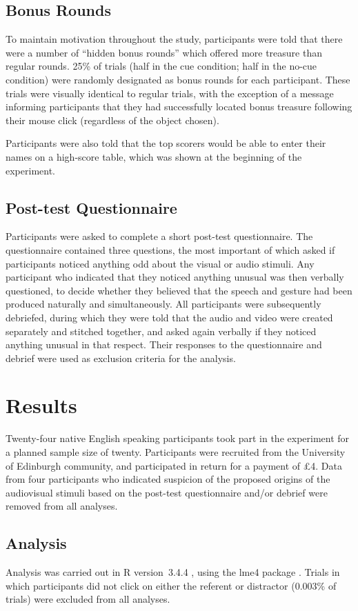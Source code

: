 \documentclass[a4paper,man,natbib]{apa6}
\begin{document}
\subsection{Bonus Rounds}
To maintain motivation throughout the study, participants were told that there were a number of ``hidden bonus rounds'' which offered more treasure than regular rounds.
25\% of trials (half in the cue condition; half in the no-cue condition) were randomly designated as bonus rounds for each participant.
These trials were visually identical to regular trials, with the exception of a message informing participants that they had successfully located bonus treasure following their mouse click (regardless of the object chosen).

Participants were also told that the top scorers would be able to enter their names on a high-score table, which was shown at the beginning of the experiment. 

\subsection{Post-test Questionnaire}
Participants were asked to complete a short post-test questionnaire. 
The questionnaire contained three questions, the most important of which asked if participants noticed anything odd about the visual or audio stimuli.
Any participant who indicated that they noticed anything unusual was then verbally questioned, to decide whether they believed that the speech and gesture had been produced naturally and simultaneously.
All participants were subsequently debriefed, during which they were told that the audio and video were created separately and stitched together, and asked again verbally if they noticed anything unusual in that respect. 
Their responses to the questionnaire and debrief were used as exclusion criteria for the analysis.

\section{Results}
Twenty-four native English speaking participants took part in the experiment for a planned sample size of twenty.
Participants were recruited from the University of Edinburgh community, and participated in return for a payment of \pounds{}4.
Data from four participants who indicated suspicion of the proposed origins of the audiovisual stimuli based on the post-test questionnaire and/or debrief were removed from all analyses.

\subsection{Analysis}
Analysis was carried out in R version~3.4.4 \citep{Rbase2017}, using the lme4 package \citep{Bates2015}. 
Trials in which participants did not click on either the referent or distractor (0.003\% of trials) were excluded from all analyses. 
\end{document}
